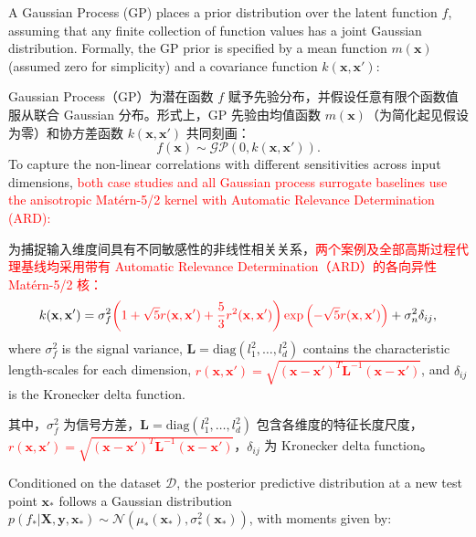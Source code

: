 \documentclass[11pt]{article}
\begin{document}
A Gaussian Process (GP) places a prior distribution over the latent function $f$, assuming that any finite collection of function values has a joint Gaussian distribution. Formally, the GP prior is specified by a mean function $m(\mathbf{x})$ (assumed zero for simplicity) and a covariance function $k(\mathbf{x}, \mathbf{x}')$:

Gaussian Process（GP）为潜在函数 $f$ 赋予先验分布，并假设任意有限个函数值服从联合 Gaussian 分布。形式上，GP 先验由均值函数 $m(\mathbf{x})$（为简化起见假设为零）和协方差函数 $k(\mathbf{x}, \mathbf{x}')$ 共同刻画：
\begin{equation}
	f(\mathbf{x}) \sim \mathcal{GP}(0, k(\mathbf{x}, \mathbf{x}')).
\end{equation}
To capture the non-linear correlations with different sensitivities across input dimensions, \textcolor{red}{both case studies and all Gaussian process surrogate baselines use the anisotropic Mat\'ern-5/2 kernel with Automatic Relevance Determination (ARD):}

为捕捉输入维度间具有不同敏感性的非线性相关关系，\textcolor{red}{两个案例及全部高斯过程代理基线均采用带有 Automatic Relevance Determination（ARD）的各向异性 Mat\'ern-5/2 核：}
\begin{equation}
	k(\mathbf{x}, \mathbf{x}') = \sigma_f^2 \textcolor{red}{\left( 1 + \sqrt{5}r(\mathbf{x}, \mathbf{x}') + \frac{5}{3}r^2(\mathbf{x}, \mathbf{x}') \right)\exp \left( - \sqrt{5}r(\mathbf{x}, \mathbf{x}') \right)} + \sigma_n^2 \delta_{ij},
\end{equation}
where $\sigma_f^2$ is the signal variance, $\mathbf{L} = \text{diag}(l_1^2, \ldots, l_d^2)$ contains the characteristic length-scales for each dimension, \textcolor{red}{$r(\mathbf{x}, \mathbf{x}') = \sqrt{(\mathbf{x} - \mathbf{x}')^T \mathbf{L}^{-1} (\mathbf{x} - \mathbf{x}')}$}, and $\delta_{ij}$ is the Kronecker delta function.

其中，$\sigma_f^2$ 为信号方差，$\mathbf{L} = \text{diag}(l_1^2, \ldots, l_d^2)$ 包含各维度的特征长度尺度，\textcolor{red}{$r(\mathbf{x}, \mathbf{x}') = \sqrt{(\mathbf{x} - \mathbf{x}')^T \mathbf{L}^{-1} (\mathbf{x} - \mathbf{x}')}$}，$\delta_{ij}$ 为 Kronecker delta function。

Conditioned on the dataset $\mathcal{D}$, the posterior predictive distribution at a new test point $\mathbf{x}_*$ follows a Gaussian distribution $p(f_* | \mathbf{X}, \mathbf{y}, \mathbf{x}_*) \sim \mathcal{N}(\mu_*(\mathbf{x}_*), \sigma_*^2(\mathbf{x}_*))$, with moments given by:
\end{document}
